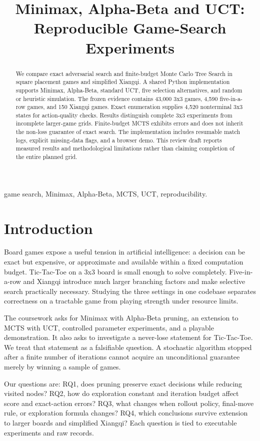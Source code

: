 \documentclass[conference]{IEEEtran}
\title{Minimax, Alpha-Beta and UCT: Reproducible Game-Search Experiments}
\author{\IEEEauthorblockN{Coursework review draft}\IEEEauthorblockA{Author details to be supplied by the project owner}}
\begin{document}
\maketitle
\begin{abstract}We compare exact adversarial search and finite-budget Monte Carlo Tree Search in square placement games and simplified Xiangqi. A shared Python implementation supports Minimax, Alpha-Beta, standard UCT, five selection alternatives, and random or heuristic simulation. The frozen evidence contains 43,000 3x3 games, 4,590 five-in-a-row games, and 150 Xiangqi games. Exact enumeration supplies 4,520 nonterminal 3x3 states for action-quality checks. Results distinguish complete 3x3 experiments from incomplete larger-game grids. Finite-budget MCTS exhibits errors and does not inherit the non-loss guarantee of exact search. The implementation includes resumable match logs, explicit missing-data flags, and a browser demo. This review draft reports measured results and methodological limitations rather than claiming completion of the entire planned grid.\end{abstract}
\begin{IEEEkeywords}game search, Minimax, Alpha-Beta, MCTS, UCT, reproducibility.\end{IEEEkeywords}
\section{Introduction}

Board games expose a useful tension in artificial intelligence: a decision can be exact but expensive, or approximate and available within a fixed computation budget. Tic-Tac-Toe on a 3x3 board is small enough to solve completely. Five-in-a-row and Xiangqi introduce much larger branching factors and make selective search practically necessary. Studying the three settings in one codebase separates correctness on a tractable game from playing strength under resource limits.


The coursework asks for Minimax with Alpha-Beta pruning, an extension to MCTS with UCT, controlled parameter experiments, and a playable demonstration. It also asks to investigate a never-lose statement for Tic-Tac-Toe. We treat that statement as a falsifiable question. A stochastic algorithm stopped after a finite number of iterations cannot acquire an unconditional guarantee merely by winning a sample of games.


Our questions are: RQ1, does pruning preserve exact decisions while reducing visited nodes? RQ2, how do exploration constant and iteration budget affect score and exact-action errors? RQ3, what changes when rollout policy, final-move rule, or exploration formula changes? RQ4, which conclusions survive extension to larger boards and simplified Xiangqi? Each question is tied to executable experiments and raw records.
\end{document}
